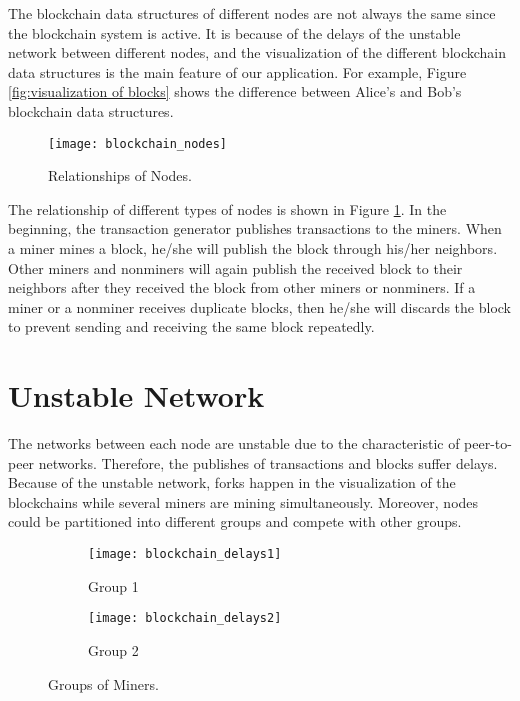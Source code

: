 The blockchain data structures of different nodes are not always the same since the blockchain system is active. It is because of the delays of the unstable network between different nodes, and the visualization of the different blockchain data structures is the main feature of our application. For example, Figure \ref{fig:visualization of blocks} shows the difference between Alice's and Bob's blockchain data structures.

\begin{figure}[htb]
    \centering
    \texttt{[image: blockchain\_nodes]}
    \caption{Relationships of Nodes.}
    \label{fig:relationship of nodes}
\end{figure}

The relationship of different types of nodes is shown in Figure \ref{fig:relationship of nodes}. In the beginning, the transaction generator publishes transactions to the miners. When a miner mines a block, he/she will publish the block through his/her neighbors. Other miners and nonminers will again publish the received block to their neighbors after they received the block from other miners or nonminers. If a miner or a nonminer receives duplicate blocks, then he/she will discards the block to prevent sending and receiving the same block repeatedly.

\section{Unstable Network}

The networks between each node are unstable due to the characteristic of peer-to-peer networks. Therefore, the publishes of transactions and blocks suffer delays. Because of the unstable network, forks happen in the visualization of the blockchains while several miners are mining simultaneously. Moreover, nodes could be partitioned into different groups and compete with other groups.

\begin{figure}[htb]
    \centering
    \begin{subfigure}[b]{1\textwidth}
        \centering
        \texttt{[image: blockchain\_delays1]}
        \caption{Group 1}
    \end{subfigure}
    
    \begin{subfigure}[b]{1\textwidth}
        \centering
        \texttt{[image: blockchain\_delays2]}
        \caption{Group 2}
    \end{subfigure}

    \caption{Groups of Miners.}
    \label{fig:groups of miners}
\end{figure}

